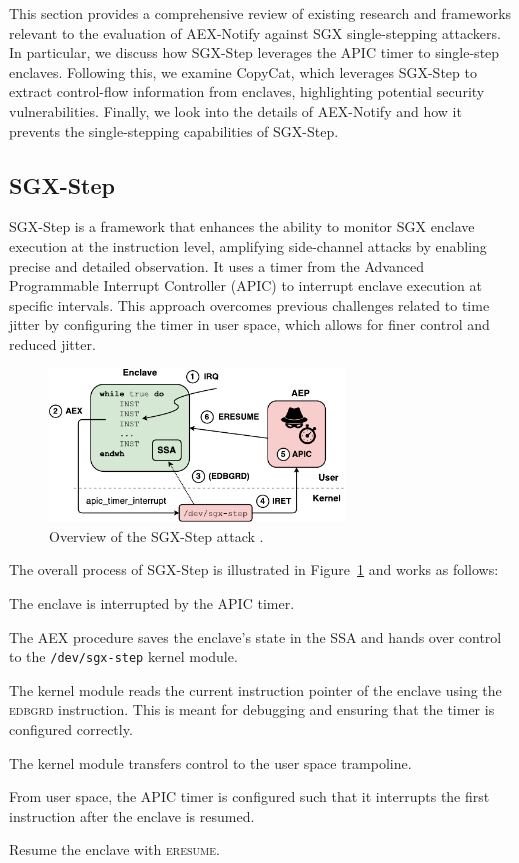 \documentclass{llncs}
\begin{document}
This section provides a comprehensive review of existing research and
frameworks relevant to the evaluation of AEX-Notify against SGX single-stepping
attackers.
In particular, we discuss how SGX-Step leverages the APIC timer to single-step
enclaves.
Following this, we examine CopyCat, which leverages SGX-Step to extract
control-flow information from enclaves, highlighting potential security
vulnerabilities.
Finally, we look into the details of AEX-Notify and how it prevents the
single-stepping capabilities of SGX-Step.

\subsection{SGX-Step}

SGX-Step \cite{BulckPS17} is a framework that enhances the ability to monitor
SGX enclave execution at the instruction level, amplifying side-channel attacks
by enabling precise and detailed observation.
It uses a timer from the Advanced Programmable Interrupt Controller (APIC) to
interrupt enclave execution at specific intervals.
This approach overcomes previous challenges related to time jitter by
configuring the timer in user space, which allows for finer control and reduced
jitter.

\begin{figure}[t!]
  \centering
  \includegraphics[width=0.7\textwidth]{images/sgx-step-overview.pdf}
  \caption{Overview of the SGX-Step attack \cite{BulckPS17}.}
  \label{fig:sgx-step}
\end{figure}

The overall process of SGX-Step is illustrated in Figure~\ref{fig:sgx-step} and
works as follows:
\begin{enumerate*}
  \item[\ding{172}]
    The enclave is interrupted by the APIC timer.
  \item[\ding{173}]
    The AEX procedure saves the enclave's state in the SSA and hands over
    control to the \texttt{/dev/sgx-step} kernel module.
  \item[\ding{174}]
    The kernel module reads the current instruction pointer of the enclave
    using the \textsc{edbgrd} instruction.
    This is meant for debugging and ensuring that the timer is configured
    correctly.
  \item[\ding{175}]
    The kernel module transfers control to the user space trampoline.
  \item[\ding{176}]
    From user space, the APIC timer is configured such that it interrupts the
    first instruction after the enclave is resumed.
  \item[\ding{177}]
    Resume the enclave with \textsc{eresume}.
\end{enumerate*}
\end{document}
